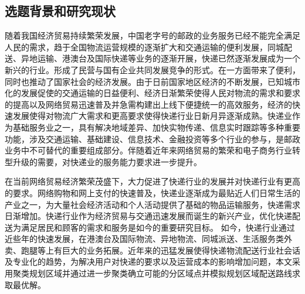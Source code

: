 \subsection{选题背景和研究现状}
\par 随着我国经济贸易持续繁荣发展，中国老字号的邮政的业务服务已经不能完全满足人民的需求，趋于全国物流运营规模的逐渐扩大和交通运输的便利发展，同城配送、异地运输、港澳台及国际快递等业务的逐渐开展，快递已然逐渐发展成为一个新兴的行业。形成了民营与国有企业共同发展竞争的形式。在一方面带来了便利，同时也推动了国家社会的经济发展。由于日前国家地区经济的不断发展，已知城市化的发展促使的交通运输的日益便利、经济日渐繁荣使得人民对物流的需求和要求的提高以及网络贸易迅速普及并急需构建出上线下便捷统一的高效服务，经济的快速发展使得对物流广大需求和更高要求使得快递行业日新月异逐渐成熟。快递业作为基础服务业之一，具有解决地域差异、加快实物传递、信息实时跟踪等多种重要功能，涉及交通运输、基础建设、信息技术、金融投资等多个行业的参与，是邮政业务中不可替代的重要组成部分。伴随着近年来网络贸易的繁荣和电子商务行业转型升级的需要，对快递业的服务能力要求进一步提升。\cite{dirac}
\par 在当前网络贸易经济繁荣茂盛下，大力促进了快递行业的发展并对快递行业有更高的要求。网络购物和网上支付的快速普及，快递业逐渐成为最贴近人们日常生活的产业之一，为大量社会经济活动和个人活动提供了基础的物品运输服务，快递需求日渐增加。快递行业作为经济贸易与交通迅速发展而诞生的新兴产业，优化快递配送为满足居民和顾客的需求和服务是如今的重要研究目标。
如今，快递行业通过近些年的快速发展，在港澳台及国际物流、异地物流、同城派送、生活服务类外卖、跑腿等上有巨大的业务拓展。近年来的迅猛发展使得快递物流配送行业社会话及专业化的趋势，为解决用户对快递的要求以及运营成本的影响增加问题，本文采用聚类规划区域并通过进一步聚类确立可能的分区域点并模拟规划区域配送路线求取最优解。\cite{knuth-fa}



